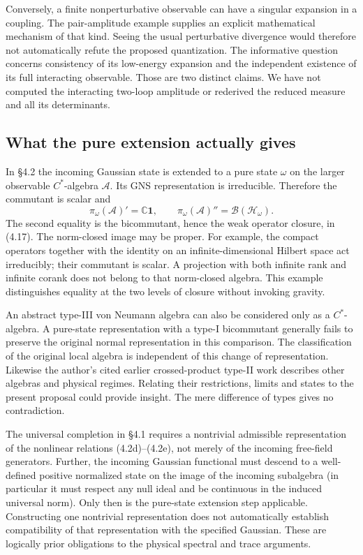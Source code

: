 \documentclass[11pt]{article}
\newcommand{\id}{\mathbf{1}}
\begin{document}
Conversely, a finite nonperturbative observable can have a singular expansion in a coupling. The pair-amplitude example supplies an explicit mathematical mechanism of that kind. Seeing the usual perturbative divergence would therefore not automatically refute the proposed quantization. The informative question concerns consistency of its low-energy expansion and the independent existence of its full interacting observable. Those are two distinct claims. We have not computed the interacting two-loop amplitude or rederived the reduced measure and all its determinants.

\subsection{What the pure extension actually gives}
In \S4.2 the incoming Gaussian state is extended to a pure state $\omega$ on the larger observable $C^*$-algebra $\mathcal A$. Its GNS representation is irreducible. Therefore the commutant is scalar and
\[
  \pi_\omega(\mathcal A)'=\mathbb C\id,\qquad
  \pi_\omega(\mathcal A)''=\mathcal B(\mathcal H_\omega).
\]
The second equality is the bicommutant, hence the weak operator closure, in (4.17). The norm-closed image may be proper. For example, the compact operators together with the identity on an infinite-dimensional Hilbert space act irreducibly; their commutant is scalar. A projection with both infinite rank and infinite corank does not belong to that norm-closed algebra. This example distinguishes equality at the two levels of closure without invoking gravity.

An abstract type-III von Neumann algebra can also be considered only as a $C^*$-algebra. A pure-state representation with a type-I bicommutant generally fails to preserve the original normal representation in this comparison. The classification of the original local algebra is independent of this change of representation. Likewise the author's cited earlier crossed-product type-II work describes other algebras and physical regimes. Relating their restrictions, limits and states to the present proposal could provide insight. The mere difference of types gives no contradiction.

The universal completion in \S4.1 requires a nontrivial admissible representation of the nonlinear relations (4.2d)--(4.2e), not merely of the incoming free-field generators. Further, the incoming Gaussian functional must descend to a well-defined positive normalized state on the image of the incoming subalgebra (in particular it must respect any null ideal and be continuous in the induced universal norm). Only then is the pure-state extension step applicable. Constructing one nontrivial representation does not automatically establish compatibility of that representation with the specified Gaussian. These are logically prior obligations to the physical spectral and trace arguments.
\end{document}
